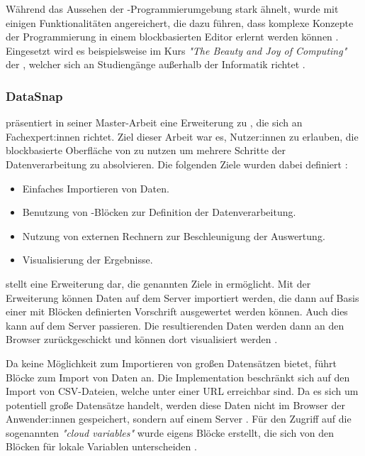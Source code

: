 Während das Aussehen der \Snap{}-Programmierumgebung \Scratch{} stark ähnelt, wurde \Snap{} mit einigen Funktionalitäten angereichert, die dazu führen, dass komplexe Konzepte der Programmierung in einem blockbasierten Editor erlernt werden können \parencite{ballSnapLook2019}. Eingesetzt wird es beispielsweise im Kurs \textit{"The Beauty and Joy of Computing"} der \citeauthor{universityofcaliforniaberkeleySnapBuild}, welcher sich an Studiengänge außerhalb der Informatik richtet \parencite{universityofcaliforniaberkeleySnapBuild}.

\subsubsection{DataSnap}
\citeauthor{hellmannDataSnapEnabling2015} präsentiert in seiner Master-Arbeit eine Erweiterung zu \Snap{}, die sich an Fachexpert:innen richtet. Ziel dieser Arbeit war es, Nutzer:innen zu erlauben, die blockbasierte Oberfläche von \Snap{} zu nutzen um mehrere Schritte der Datenverarbeitung zu absolvieren. Die folgenden Ziele wurden dabei definiert \parencite{hellmannDataSnapEnabling2015}:

\begin{itemize}
  \item Einfaches Importieren von Daten.
  \item Benutzung von \Snap{}-Blöcken zur Definition der Datenverarbeitung.
  \item Nutzung von externen Rechnern zur Beschleunigung der Auswertung.
  \item Visualisierung der Ergebnisse.
\end{itemize}

\DataSnap{} stellt eine Erweiterung dar, die genannten Ziele in \Snap{} ermöglicht. Mit der Erweiterung können Daten auf dem Server importiert werden, die dann auf Basis einer mit Blöcken definierten Vorschrift ausgewertet werden können. Auch dies kann auf dem Server passieren. Die resultierenden Daten werden dann an den Browser zurückgeschickt und können dort visualisiert werden \parencite{hellmannDataSnapEnabling2015}.

Da \Snap{} keine Möglichkeit zum Importieren von großen Datensätzen bietet, führt \DataSnap{} Blöcke zum Import von Daten an. Die Implementation beschränkt sich auf den Import von \acs{CSV}-Dateien, welche unter einer URL erreichbar sind. Da es sich um potentiell große Datensätze handelt, werden diese Daten nicht im Browser der Anwender:innen gespeichert, sondern auf einem Server \parencite{hellmannDataSnapEnabling2015}. Für den Zugriff auf die sogenannten \textit{"cloud variables"} wurde eigens Blöcke erstellt, die sich von den Blöcken für lokale Variablen unterscheiden \parencite{hellmannDataSnapEnabling2015}.

